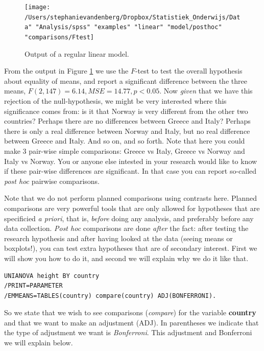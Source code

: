 \documentclass[]{book}\usepackage[]{graphicx}\usepackage[]{color}
\begin{document}
\begin{figure}[h]
    \begin{center}
       \texttt{[image: /Users/stephanievandenberg/Dropbox/Statistiek\_Onderwijs/Data" "Analysis/spss" "examples" "linear" "model/posthoc" "comparisons/Ftest]}
    \end{center}
    \caption{Output of a regular linear model.}
    \label{fig:Ftest}
\end{figure}


From the output in Figure \ref{fig:Ftest} we use the $F$-test to test the overall hypothesis about equality of means, and report a significant difference between the three means, $F(2, 147)=6.14 , MSE=14.77, p<0.05$. Now \textit{given} that we have this rejection of the null-hypothesis, we might be very interested where this significance comes from: is it that Norway is very different from the other two countries? Perhaps there are no differences between Greece and Italy? Perhaps there is only a real difference between Norway
and Italy, but no real difference between Greece and Italy. And so on, and so forth. Note that here you could make 3 pair-wise simple comparisons: Greece vs Italy, Greece vs Norway and Italy vs Norway. You or anyone else intested in your research would like to know if these pair-wise differences are significant. In that case you can report so-called \textit{post hoc} pairwise comparisons. 

Note that we do not perform planned comparisons using contrasts here. Planned comparisons are very powerful tools that are only allowed for hypotheses that are specificied \textit{a priori}, that is, \textit{before} doing any analysis, and preferably before any data collection. \textit{Post hoc} comparisons are done \textit{after} the fact: after testing the research hypothesis and after having looked at the data (seeing means or boxplots!), you can test extra hypotheses that are of secondary interest. First we will show you how to do it, and second we will explain why we do it like that. 

\begin{verbatim}
UNIANOVA height BY country
/PRINT=PARAMETER
/EMMEANS=TABLES(country) compare(country) ADJ(BONFERRONI).
\end{verbatim}

So we state that we wish to see comparisons (\textit{compare}) for the variable \textbf{country} and that we want to make an adjustment (ADJ). In parentheses we indicate that the type of adjustment we want is \textit{Bonferroni}. This adjustment and Bonferroni we will explain below.
\end{document}
